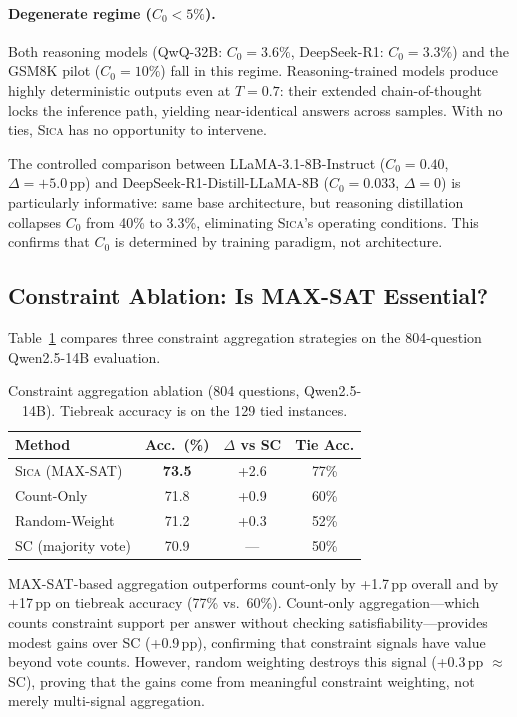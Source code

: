 \documentclass[11pt,a4paper]{article}
\newcommand{\sica}{\textsc{Sica}}
\newcommand{\czero}{C_0}
\begin{document}
\paragraph{Degenerate regime ($\czero{}<5\%$).}
Both reasoning models (QwQ-32B: $\czero{}{=}3.6\%$, DeepSeek-R1: $\czero{}{=}3.3\%$) and the GSM8K pilot ($\czero{}{=}10\%$) fall in this regime.
Reasoning-trained models produce highly deterministic outputs even at $T{=}0.7$: their extended chain-of-thought locks the inference path, yielding near-identical answers across samples.
With no ties, \sica{} has no opportunity to intervene.

The controlled comparison between LLaMA-3.1-8B-Instruct ($\czero{}{=}0.40$, $\Delta{=}+5.0$\,pp) and DeepSeek-R1-Distill-LLaMA-8B ($\czero{}{=}0.033$, $\Delta{=}0$) is particularly informative: same base architecture, but reasoning distillation collapses $\czero{}$ from 40\% to 3.3\%, eliminating \sica{}'s operating conditions.
This confirms that $\czero{}$ is determined by training paradigm, not architecture.


\subsection{Constraint Ablation: Is MAX-SAT Essential?}
\label{sec:ablation}

Table~\ref{tab:ablation} compares three constraint aggregation strategies on the 804-question Qwen2.5-14B evaluation.

\begin{table}[t]
\centering
\caption{Constraint aggregation ablation (804 questions, Qwen2.5-14B). Tiebreak accuracy is on the 129 tied instances.}
\label{tab:ablation}
\small
\begin{tabular}{@{}l cc c@{}}
\toprule
\textbf{Method} & \textbf{Acc.\ (\%)} & $\Delta$ vs SC & \textbf{Tie Acc.} \\
\midrule
\sica{} (MAX-SAT)     & \textbf{73.5} & +2.6 & 77\% \\
Count-Only             & 71.8 & +0.9 & 60\% \\
Random-Weight          & 71.2 & +0.3 & 52\% \\
SC (majority vote)     & 70.9 & ---  & 50\% \\
\bottomrule
\end{tabular}
\end{table}

MAX-SAT-based aggregation outperforms count-only by +1.7\,pp overall and by +17\,pp on tiebreak accuracy (77\% vs.\ 60\%).
Count-only aggregation---which counts constraint support per answer without checking satisfiability---provides modest gains over SC (+0.9\,pp), confirming that constraint signals have value beyond vote counts.
However, random weighting destroys this signal (+0.3\,pp $\approx$ SC), proving that the gains come from meaningful constraint weighting, not merely multi-signal aggregation.
\end{document}
